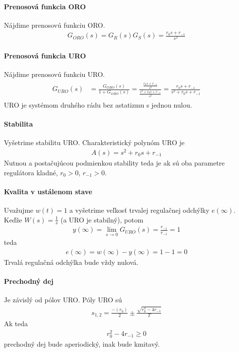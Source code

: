 \documentclass[a4paper, 10pt, ]{article}
\begin{document}
\paragraph{Prenosová funkcia ORO}
Nájdime prenosovú funkciu ORO.
\begin{align}
    G_{ORO}(s) = G_R(s) G_S(s) =  \frac{r_0 s + r_{-1}}{s^2}
\end{align}


\paragraph{Prenosová funkcia URO}
Nájdime prenosovú funkciu URO.
\begin{align}
    \begin{aligned}
    G_{URO}(s)
    &=  \frac{G_{ORO}(s)}{1+G_{ORO}(s)}
    = \frac{   \frac{r_0 s + r_{-1}}{s^2}   }{     \frac{s^2 + r_0 s + r_{-1}}{s^2}   }
    = \frac{  r_0 s + r_{-1}   }{    s^2 + r_0 s + r_{-1}   }
    \end{aligned}
\end{align}
URO je systémom druhého rádu bez astatizmu s jednou nulou.

\paragraph{Stabilita}
Vyšetrime stabilitu URO. Charakteristický polynóm URO je
\begin{align}
    A(s) =  s^2 + r_0 s + r_{-1}
\end{align}
Nutnou a postačujúcou podmienkou stability teda je ak sú oba parametre regulátora kladné, $r_0 > 0$, $r_{-1} > 0$.

\paragraph{Kvalita v ustálenom stave}
Uvažujme $w(t) = 1$ a vyšetrime veľkosť trvalej regulačnej odchýlky $e(\infty)$. Keďže $W(s) = \frac{1}{s}$ (a URO je stabilný), potom
\begin{align}
    y(\infty) = \lim_{s\to0} G_{URO}(s) = \frac{r_{-1}}{r_{-1}} = 1
\end{align}
teda
\begin{align}
    e(\infty)
    = w(\infty) - y(\infty)
    = 1 - 1
    = 0
\end{align}
Trvalá regulačná odchýlka bude vždy nulová.

\paragraph{Prechodný dej}
Je závislý od pólov URO. Póly URO sú
\begin{align}
    s_{1,2} = \frac{-(r_0)}{2} \pm \frac{ \sqrt{r_0^2 - 4r_{-1} }}{T}
\end{align}
Ak teda
\begin{align}
     r_0^2 - 4r_{-1} \geq 0
\end{align}
prechodný dej bude aperiodický, inak bude kmitavý.
\end{document}
